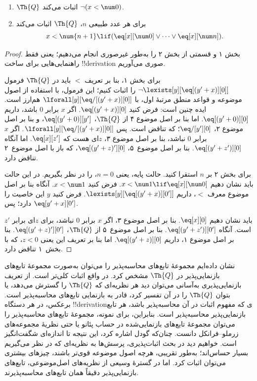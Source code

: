 \documentclass[../../../include/open-logic-section]{subfiles}
\begin{document}
\begin{lem}
\begin{enumerate}
\item $\Th{Q}$ اثبات می‌کند $\lnot (x < \num 0)$.
\item برای هر عدد طبیعی $n$، $\Th{Q}$ اثبات می‌کند
\[
x < \num {n+1} \lif (\eq[x][\num 0] \lor \dots \lor \eq[x][\num n]).
\]
\end{enumerate}
\end{lem}

\begin{proof}
بخش ۱ و قسمتی از بخش ۲ را به‌طور غیرصوری انجام می‌دهیم؛ یعنی فقط
راهنمایی‌هایی برای ساخت !!{derivation} صوری می‌آوریم.

برای بخش ۱، بنا بر تعریف $<$ باید در $\Th{Q}$ فرمول
$\lnot \lexists[y][\eq[(y'+x)][0]]$ را اثبات کنیم؛ این فرمول، با
استفاده از اصول موضوعه و قواعد منطق مرتبهٔ اول، با
$\lforall[y][\eq/[(y' + x)][0]]$ هم‌ارز است. ایده چنین است: فرض کنید
$\eq[(y'+x)][0]$. اگر $x$ برابر $0$ باشد، داریم
$\eq[(y' + 0)][0]$. اما بنا بر اصل موضوع ۴ از $\Th{Q}$،
$\eq[(y' + 0)][y']$، و بنا بر اصل موضوع ۲،
$\eq/[y'][0]$؛ که تناقض است. پس
$\lforall[y][\eq/[(y' +x)][0]]$. اگر $x$ برابر $0$ نباشد، بنا بر اصل
موضوع ۳، $z$ای هست که $\eq[x][z']$. اما آنگاه
$\eq[(y' + z')][0]$. بنا بر اصل موضوع~۵،
$\eq[(y' + z)'][0]$، که باز با اصل موضوع~۲ تناقض دارد.

برای بخش ۲ بر $n$ استقرا کنید. حالت پایه، یعنی $n =0$، را در نظر
بگیریم. در این حالت باید نشان دهیم
$x < \num 1 \lif \eq[x][\num 0]$. فرض کنید $x < \num 1$. آنگاه بنا بر
اصل موضوع معرف $<$، داریم
$\lexists[y][\eq[(y'+x)][0']]$. فرض کنید $y$ این خاصیت را دارد؛ پس
$\eq[y'+x][0']$.

باید نشان دهیم $\eq[x][0]$. بنا بر اصل موضوع ۳، اگر $x$ برابر $0$
نباشد، برای $z$ای برابر $z'$ است. آنگاه
$\eq[(y' + z')][0']$. بنا بر اصل موضوع~۵ از $\Th{Q}$،
$\eq[(y'+z)'][0']$. بنا بر اصل موضوع ۱، داریم
$\eq[(y' + z)][0]$. اما بنا بر تعریف این یعنی $z < 0$، که با بخش~۱
تناقض دارد.
\end{proof}

\begin{explain}
نشان داده‌ایم مجموعهٔ تابع‌های محاسبه‌پذیر را می‌توان به‌صورت مجموعهٔ
تابع‌های بازنمایی‌پذیر در $\Th{Q}$ مشخص کرد. در واقع اثبات کلی‌تر است.
از تعریف بازنمایی‌پذیری به‌آسانی می‌توان دید هر نظریه‌ای که $\Th{Q}$
را گسترش می‌دهد، یا بتوان $\Th{Q}$ را در آن تفسیر کرد، قادر به
بازنمایی تابع‌های محاسبه‌پذیر است. برعکس، در هر دستگاه
!!{derivation}ی که مفهوم اثبات در آن محاسبه‌پذیر باشد، هر تابع
بازنمایی‌پذیر محاسبه‌پذیر است. بنابراین، برای نمونه، مجموعهٔ تابع‌های
محاسبه‌پذیر را می‌توان مجموعهٔ تابع‌های بازنمایی‌شده در حساب پئانو یا
حتی نظریهٔ مجموعه‌های زرملو--فرانکل دانست. چنان‌که گودل اشاره کرد، این
نتیجه تا اندازه‌ای شگفت‌انگیز است. خواهیم دید در بحث اثبات‌پذیری،
پرسش‌ها به نظریه‌ای که در نظر می‌گیریم بسیار حساس‌اند؛ به‌طور تقریبی،
هرچه اصول موضوعه قوی‌تر باشند، چیزهای بیشتری می‌توان اثبات کرد. اما در
گسترهٔ وسیعی از نظریه‌های اصل‌موضوعی، تابع‌های بازنمایی‌پذیر دقیقاً
همان تابع‌های محاسبه‌پذیرند.
\end{explain}
\end{document}
